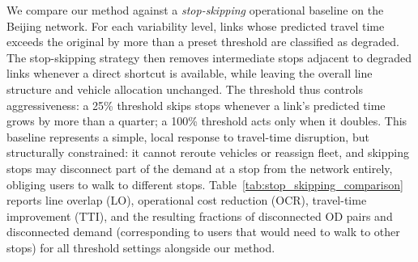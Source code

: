\documentclass[a4paper,fleqn]{cas-sc}
\begin{document}
We compare our method against a \emph{stop-skipping} operational baseline on the Beijing network.
For each variability level, links whose predicted travel time exceeds the original by more than a preset threshold are classified as degraded.
The stop-skipping strategy then removes intermediate stops adjacent to degraded links whenever a direct shortcut is available, while leaving the overall line structure and vehicle allocation unchanged.
The threshold thus controls aggressiveness: a 25\% threshold skips stops whenever a link's predicted time grows by more than a quarter; a 100\% threshold acts only when it doubles.
This baseline represents a simple, local response to travel-time disruption, but structurally constrained: it cannot reroute vehicles or reassign fleet, and skipping stops may disconnect part of the demand at a stop from the network entirely, obliging users to walk to different stops.
Table~\ref{tab:stop_skipping_comparison} reports line overlap (LO), operational cost reduction (OCR), travel-time improvement (TTI), and the resulting fractions of disconnected OD pairs and disconnected demand (corresponding to users that would need to walk to other stops) for all threshold settings alongside our method.
\end{document}
